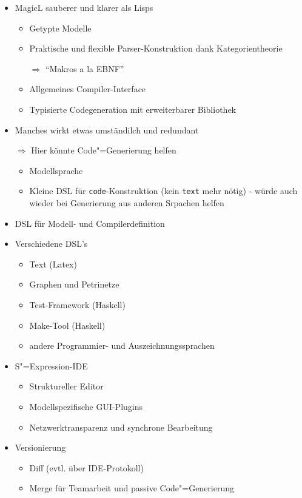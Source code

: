 \documentclass[11pt, a4paper, bibgerm]{scrbook}
\newcommand\icode[1]{\lstinline?#1?}
\newcommand{\sexp}{S"=Expression}
\newcommand{\cgen}{Code"=Generierung}
\begin{document}
  \begin{itemize}
  \item MagicL sauberer und klarer als Lisps
    \begin{itemize}
    \item Getypte Modelle
    \item Praktische und flexible Parser-Konstruktion dank Kategorientheorie
    \item[$\Rightarrow$] "`Makros a la EBNF"'
    \item Allgemeines Compiler-Interface
    \item Typisierte Codegeneration mit erweiterbarer Bibliothek
    \end{itemize}
  \item Manches wirkt etwas umständilch und redundant
  \item[$\Rightarrow$] Hier könnte \cgen{} helfen
    \begin{itemize}
    \item Modellsprache
    \item Kleine DSL für \icode{code}-Konstruktion (kein \icode{text}
      mehr nötig) - würde auch wieder bei Generierung aus anderen
      Srpachen helfen
    \end{itemize}
\item DSL für Modell- und Compilerdefinition
\item Verschiedene DSL's
  \begin{itemize}
  \item Text (Latex)
  \item Graphen und Petrinetze
  \item Test-Framework (Haskell)
  \item Make-Tool (Haskell)
  \item andere Programmier- und Auszeichnungssprachen
  \end{itemize}
\item \sexp{}-IDE
  \begin{itemize}
  \item Struktureller Editor
  \item Modellspezifische GUI-Plugins
  \item Netzwerktransparenz und synchrone Bearbeitung
  \end{itemize}
\item Versionierung
  \begin{itemize}
  \item Diff (evtl. über IDE-Protokoll)
  \item Merge für Teamarbeit und passive \cgen{}
  \end{itemize}
\end{itemize}
\end{document}
